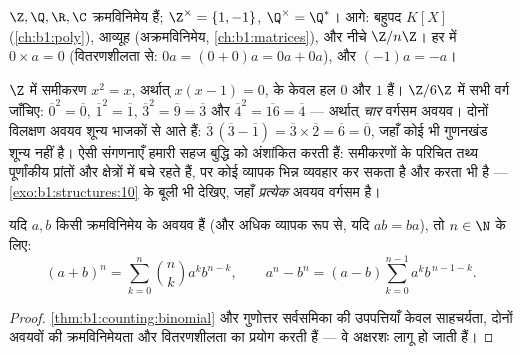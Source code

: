 \begin{example}\label{ex:b1:structures:rings}
$\Z, \Q, \R, \C$ क्रमविनिमेय  हैं; $\Z^\times = \{1, -1\}$, $\Q^\times =
\Q^*$। आगे: बहुपद  $K[X]$ (\cref{ch:b1:poly}), आव्यूह  (अक्रमविनिमेय,
\cref{ch:b1:matrices}), और नीचे $\Z/n\Z$। हर  में $0 \times a = 0$
(वितरणशीलता से: $0a = (0+0)a = 0a + 0a$), और $(-1)a = -a$।
\end{example}

\begin{example}\label{ex:b1:structures:idempotents}
$\Z$ में समीकरण $x^2 = x$, अर्थात् $x(x - 1) = 0$, के केवल हल $0$ और $1$
हैं। $\Z/6\Z$ में सभी वर्ग जाँचिए: $\overline0^2 = \overline0$,
$\overline1^2 = \overline1$, $\overline3^2 = \overline9 = \overline3$ और
$\overline4^2 = \overline{16} = \overline4$ --- अर्थात् \emph{चार} वर्गसम
अवयव। दोनों विलक्षण अवयव शून्य भाजकों से आते हैं: $\overline3\,(\overline3 -
\overline1) = \overline3 \times \overline2 = \overline6 = \overline0$, जहाँ
कोई भी गुणनखंड शून्य नहीं है। ऐसी संगणनाएँ हमारी सहज बुद्धि को अंशांकित करती
हैं: समीकरणों के परिचित तथ्य पूर्णांकीय प्रांतों और क्षेत्रों में बचे रहते
हैं, पर कोई व्यापक  भिन्न व्यवहार कर सकता है और करता भी है ---
\cref{exo:b1:structures:10} के बूली  भी देखिए, जहाँ \emph{प्रत्येक} अवयव
वर्गसम है।
\end{example}

\begin{proposition}\label{prop:b1:structures:binomial}
यदि $a, b$ किसी क्रमविनिमेय  के अवयव हैं (और अधिक व्यापक रूप से, यदि $ab
= ba$), तो $n \in \N$ के लिए:
\[
(a+b)^n = \sum_{k=0}^n \binom nk a^k b^{n-k},
\qquad
a^n - b^n = (a - b) \sum_{k=0}^{n-1} a^k b^{\,n-1-k} .
\]
\end{proposition}

\begin{proof}
\cref{thm:b1:counting:binomial} और गुणोत्तर सर्वसमिका की उपपत्तियाँ केवल
साहचर्यता, दोनों अवयवों की क्रमविनिमेयता और वितरणशीलता का प्रयोग करती हैं
--- वे अक्षरशः लागू हो जाती हैं।
\end{proof}


